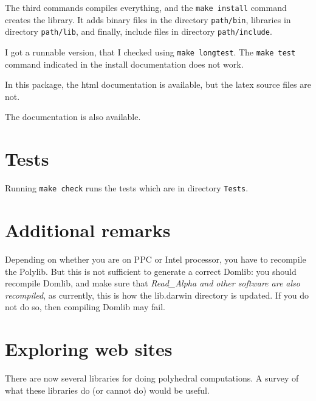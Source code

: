 \documentclass[12pt]{article}
\begin{document}
The third commands compiles everything, and the \texttt{make install} command 
creates the library. It adds binary files in the directory \texttt{path/bin}, libraries in directory \texttt{path/lib}, and 
finally, include files in directory \texttt{path/include}.

I got a runnable version, that I checked using \texttt{make longtest}. The 
\texttt{make test} command indicated in the install documentation does not work.

In this package, the html documentation is available, but the latex source files 
are not.

The documentation is also available.
\section{Tests}
Running \texttt{make check} runs the tests which are in directory \texttt{Tests}.

\section{Additional remarks}
Depending on whether you are on PPC or Intel processor, you have to recompile 
the Polylib. But this is not sufficient to generate a correct Domlib: you should recompile
Domlib, and make sure that {\em Read\_Alpha and other software are also recompiled}, 
as currently, this is how the lib.darwin directory is updated. If you do not do so, then
compiling Domlib may fail. 

\section{Exploring web sites}
There are now several libraries for doing polyhedral computations. A survey of what these
libraries do (or cannot do) would be useful.
\end{document}
